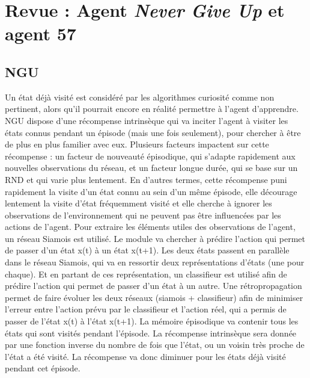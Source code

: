 \documentclass[a4paper,12pt]{report}
\begin{document}
\newpage \section{Revue : Agent \textit{Never Give Up} \cite{ngu} et agent 57 \cite{agent57}}
\subsection{NGU}
\indent Un état déjà visité est considéré par les algorithmes curiosité comme non pertinent, alors qu’il pourrait encore en réalité permettre à l’agent d’apprendre.
\newline \indent  NGU dispose d’une récompense intrinsèque qui va inciter l’agent à visiter les états connus pendant un épisode (mais une fois seulement), pour chercher à être de plus en plus familier avec eux. Plusieurs facteurs impactent sur cette récompense : un facteur de nouveauté épisodique, qui s’adapte rapidement aux nouvelles observations du réseau, et un facteur longue durée, qui se base sur un RND et qui varie plus lentement. En d’autres termes, cette récompense puni rapidement la visite d’un état connu au sein d’un même épisode, elle décourage lentement la visite d’état fréquemment visité et elle cherche à ignorer les observations de l’environnement qui ne peuvent pas être influencées par les actions de l’agent.
\newline \indent  Pour extraire les éléments utiles des observations de l’agent, un réseau Siamois est utilisé. Le module va chercher à prédire l’action qui permet de passer d’un état x(t) à un état x(t+1). Les deux états passent en parallèle dans le réseau Siamois, qui va en ressortir deux représentations d’états (une pour chaque). Et en partant de ces représentation, un classifieur est utilisé afin de prédire l’action qui permet de passer d’un état à un autre. Une rétropropagation permet de faire évoluer les deux réseaux (siamois + classifieur) afin de minimiser l’erreur entre l’action prévu par le classifieur et l’action réel, qui a permis de passer de l'état x(t) à l'état x(t+1).
\newline \indent  La mémoire épisodique va contenir tous les états qui sont visités pendant l’épisode. La récompense intrinsèque sera donnée par une fonction inverse du nombre de fois que l’état, ou un voisin très proche de l’état a été visité. La récompense va donc diminuer pour les états déjà visité pendant cet épisode.
\end{document}
